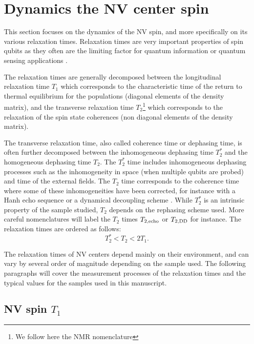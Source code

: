 \documentclass[a4paper,11pt]{report}
\begin{document}
\section{Dynamics the NV center spin}

This section focuses on the dynamics of the NV spin, and more specifically on its various relaxation times. Relaxation times are very important properties of spin qubits as they often are the limiting factor for quantum information or quantum sensing applications \citep{de2021materials, degen2017quantum}.

The relaxation times are generally decomposed between the longitudinal relaxation time $T_1$ which corresponds to the characteristic time of the return to thermal equilibrium for the populations (diagonal elements of the density matrix), and the transverse relaxation time $T_2$\footnote{We follow here the NMR nomenclature} which corresponds to the relaxation of the spin state coherences (non diagonal elements of the density matrix).

The transverse relaxation time, also called coherence time or dephasing time, is often further decomposed between the inhomogeneous dephasing time $T_2^*$ and the homogeneous dephasing time $T_2$. The $T_2^*$ time includes inhomogeneous dephasing processes such as the inhomogeneity in space (when multiple qubits are probed) and time of the external fields. The $T_2$ time corresponds to the coherence time where some of these inhomogeneities have been corrected, for instance with a Hanh echo sequence \citep{hahn1950spin} or a dynamical decoupling scheme \citep{naydenov2011dynamical}. While $T_2^*$ is an intrinsic property of the sample studied, $T_2$ depends on the rephasing scheme used. More careful nomenclatures will label the $T_2$ times $T_{2,\rm echo}$ or $T_{2,\rm DD}$ \citep{de2021materials} for instance. The relaxation times are ordered as follows:
\begin{equation}
T_2^* < T_2 < 2 T_1.
\end{equation}

The relaxation times of NV centers depend mainly on their environment, and can vary by several order of magnitude depending on the sample used. The following paragraphs will cover the measurement processes of the relaxation times and the typical values for the samples used in this manuscript.

\subsection{NV spin $T_1$}
\end{document}
